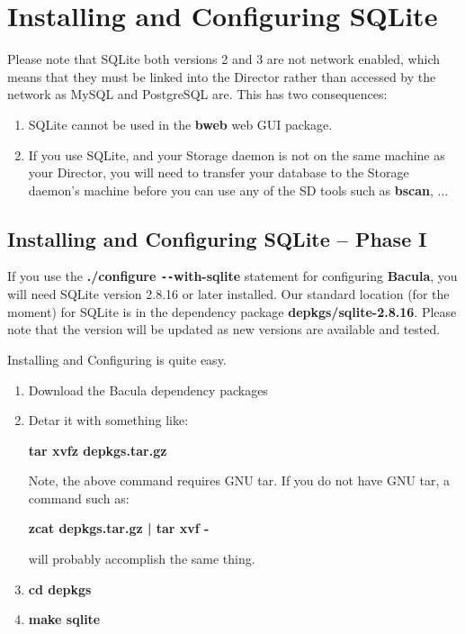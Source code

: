 
\chapter{Installing and Configuring SQLite}
\label{SqlLiteChapter}

Please note that SQLite both versions 2 and 3 are not network enabled,
which means that they must be linked into the Director rather than accessed
by the network as MySQL and PostgreSQL are. This has two consequences:
\begin{enumerate}
\item SQLite cannot be used in the {\bf bweb} web GUI package.
\item If you use SQLite, and your Storage daemon is not on the same
machine as your Director, you will need to transfer your database
to the Storage daemon's machine before you can use any of the SD tools
such as {\bf bscan}, ...
\end{enumerate}

\section{Installing and Configuring SQLite -- Phase I}

If you use the {\bf ./configure \verb:--:with-sqlite} statement for configuring {\bf
Bacula}, you will need SQLite version 2.8.16 or later installed. Our standard
location (for the moment) for SQLite is in the dependency package {\bf
depkgs/sqlite-2.8.16}. Please note that the version will be updated as new
versions are available and tested. 

Installing and Configuring is quite easy. 

\begin{enumerate}
\item Download the Bacula dependency packages  
\item Detar it with something like:

   {\bf tar xvfz depkgs.tar.gz}  

   Note, the above command requires GNU tar. If you do not  have GNU tar, a
   command such as:

   {\bf zcat depkgs.tar.gz | tar xvf -}

   will probably accomplish the same thing. 

\item {\bf cd depkgs}

\item {\bf make sqlite}  

\end{enumerate}


